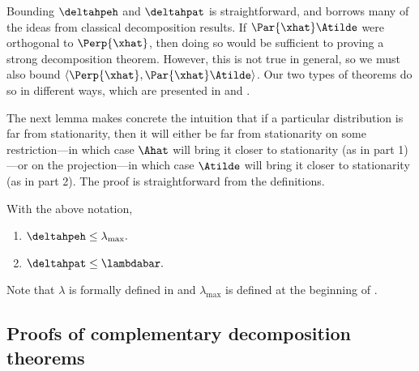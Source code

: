 Bounding  $\deltahpeh$ and $\deltahpat$ is straightforward, and borrows 
many of the ideas from classical decomposition results.  If 
$\Par{\xhat}\Atilde$ were orthogonal to $\Perp{\xhat}$, then doing so 
would be sufficient to proving a strong decomposition theorem.  
However, this is not true in general, so we must also bound 
$\langle\Perp{\xhat},\Par{\xhat}\Atilde\rangle$.  Our two types of 
theorems do so in different ways, which are presented in 
 and .

The next lemma makes concrete the intuition that if a particular 
distribution is far from stationarity, then it will either be far from 
stationarity on some restriction---in which case $\Ahat$ will bring it 
closer to stationarity (as in part 1)---or on the projection---in which 
case $\Atilde$ will bring it closer to stationarity (as in part 2).  
The proof is straightforward from the definitions. 

\begin{lemma}\label{lem:eta}
  With the above notation,
\begin{enumerate}
\item $\deltahpeh \leq \lambda_{\max}.$
\item $\deltahpat \leq \lambdabar.$
\end{enumerate}
\end{lemma}
\noindent Note that $\lambda$ is formally defined in  and $\lambda_{\max}$ is defined at the beginning of .

\subsection{Proofs of complementary decomposition theorems}\label{sec:tight}\label{sec:orthog}

